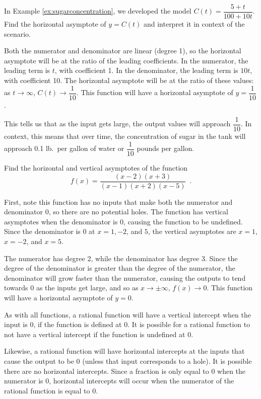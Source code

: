 \begin{example}
In Example \ref{ex:sugarconcentration}, we developed the model $C(t)=\dfrac{5+t}{100+10t}$. Find the horizontal asymptote of $y=C(t)$ and interpret it in context of the scenario.

\begin{solution} Both the numerator and denominator are linear (degree 1), so the horizontal asymptote will be at the ratio of the leading coefficients. In the numerator, the leading term is $t$, with coefficient 1. In the denominator, the leading term is $10t$, with coefficient 10. The horizontal asymptote will be at the ratio of these values: as $t\to\infty$, $C(t)\to \dfrac{1}{10}$. This function will have a horizontal asymptote of $y=\dfrac{1}{10}$.

This tells us that as the input gets large, the output values will approach $\dfrac{1}{10}$. In context, this means that over time, the concentration of sugar in the tank will approach 0.1 lb.\ per gallon of water or $\dfrac{1}{10}$ pounds per gallon.
\end{solution}\end{example}
\begin{example}
Find the horizontal and vertical asymptotes of the function
$$f(x) = \dfrac{(x-2)(x+3)}{(x-1)(x+2)(x-5)} \enspace.$$

\begin{solution} First, note this function has no inputs that make both the numerator and denominator 0, so there are no potential holes. The function has vertical asymptotes when the denominator is 0, causing the function to be undefined. Since the denominator is 0 at $x= 1, -2$, and $5$, the vertical asymptotes are $x=1$, $x=-2$, and $x=5$.

The numerator has degree 2, while the denominator has degree 3. Since the degree of the denominator is greater than the degree of the numerator, the denominator will grow faster than the numerator, causing the outputs to tend towards 0 as the inputs get large, and so as $x\to\pm\infty$, $f(x)\to 0$. This function will have a horizontal asymptote of $y=0$.
\end{solution}\end{example}

As with all functions, a rational function will have a vertical intercept when the input is 0, if the function is defined at 0. It is possible for a rational function to not have a vertical intercept if the function is undefined at 0.

Likewise, a rational function will have horizontal intercepts at the inputs that cause the output to be 0 (unless that input corresponds to a hole). It is possible there are no horizontal intercepts. Since a fraction is only equal to 0 when the numerator is 0, horizontal intercepts will occur when the numerator of the rational function is equal to 0.

